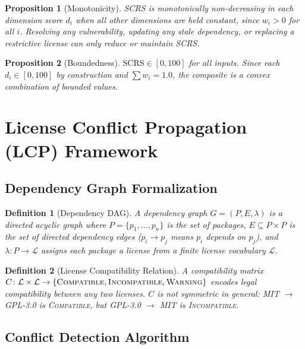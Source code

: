 \documentclass[11pt,twocolumn]{article}
\newtheorem{definition}{Definition}
\newtheorem{proposition}{Proposition}
\begin{document}
\begin{proposition}[Monotonicity]
SCRS is monotonically non-decreasing in each dimension score $d_i$ when all
other dimensions are held constant, since $w_i > 0$ for all $i$. Resolving any
vulnerability, updating any stale dependency, or replacing a restrictive license
can only reduce or maintain SCRS.
\end{proposition}

\begin{proposition}[Boundedness]
$\mathrm{SCRS} \in [0, 100]$ for all inputs. Since each $d_i \in [0, 100]$ by
construction and $\sum w_i = 1.0$, the composite is a convex combination of
bounded values.
\end{proposition}

\FloatBarrier

\section{License Conflict Propagation (LCP) Framework}

\subsection{Dependency Graph Formalization}

\begin{definition}[Dependency DAG]
A \emph{dependency graph} $G = (P, E, \lambda)$ is a directed acyclic graph
where $P = \{p_1, \ldots, p_n\}$ is the set of packages, $E \subseteq P \times P$
is the set of directed dependency edges ($p_i \to p_j$ means $p_i$ depends on
$p_j$), and $\lambda\colon P \to \mathcal{L}$ assigns each package a license from
a finite license vocabulary $\mathcal{L}$.
\end{definition}

\begin{definition}[License Compatibility Relation]
A \emph{compatibility matrix} $C\colon \mathcal{L} \times \mathcal{L} \to
\{{\normalfont\textsc{Compatible}},\allowbreak{\normalfont\textsc{Incompatible}},\allowbreak{\normalfont\textsc{Warning}}\}$
encodes legal compatibility between any two licenses. $C$ is not symmetric in
general: MIT $\to$ GPL-3.0 is {\normalfont\textsc{Compatible}}, but GPL-3.0 $\to$ MIT is
{\normalfont\textsc{Incompatible}}.
\end{definition}

\subsection{Conflict Detection Algorithm}
\end{document}
